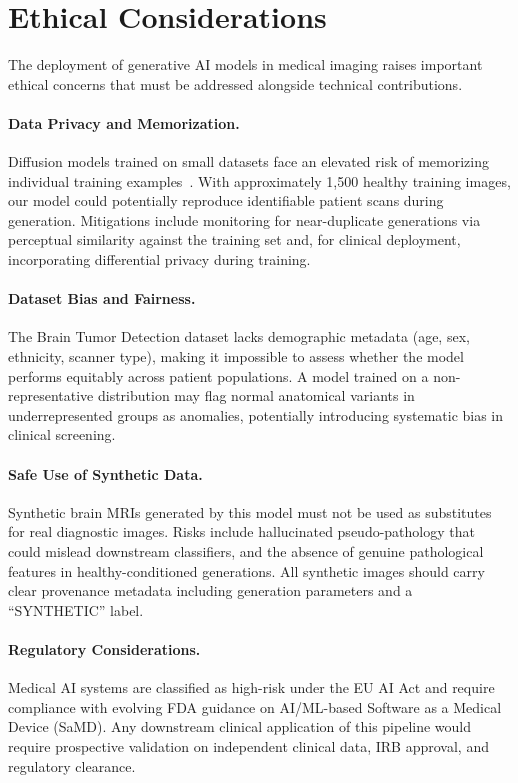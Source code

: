 \section{Ethical Considerations}
\label{sec:ethics}

The deployment of generative AI models in medical imaging raises important ethical concerns that must be addressed alongside technical contributions.

\paragraph{Data Privacy and Memorization.} Diffusion models trained on small datasets face an elevated risk of memorizing individual training examples~\cite{akbar2023beware, dar2024investigating}. With approximately 1,500 healthy training images, our model could potentially reproduce identifiable patient scans during generation. Mitigations include monitoring for near-duplicate generations via perceptual similarity against the training set and, for clinical deployment, incorporating differential privacy during training.

\paragraph{Dataset Bias and Fairness.} The Brain Tumor Detection dataset lacks demographic metadata (age, sex, ethnicity, scanner type), making it impossible to assess whether the model performs equitably across patient populations. A model trained on a non-representative distribution may flag normal anatomical variants in underrepresented groups as anomalies, potentially introducing systematic bias in clinical screening.

\paragraph{Safe Use of Synthetic Data.} Synthetic brain MRIs generated by this model must not be used as substitutes for real diagnostic images. Risks include hallucinated pseudo-pathology that could mislead downstream classifiers, and the absence of genuine pathological features in healthy-conditioned generations. All synthetic images should carry clear provenance metadata including generation parameters and a ``SYNTHETIC'' label.

\paragraph{Regulatory Considerations.} Medical AI systems are classified as high-risk under the EU AI Act and require compliance with evolving FDA guidance on AI/ML-based Software as a Medical Device (SaMD). Any downstream clinical application of this pipeline would require prospective validation on independent clinical data, IRB approval, and regulatory clearance.


